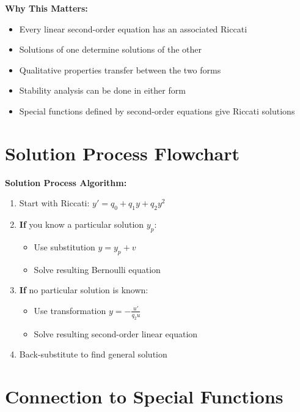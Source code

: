 \documentclass[12pt]{article}
\begin{document}
\begin{insight}
\textbf{Why This Matters:}
\begin{itemize}
    \item Every linear second-order equation has an associated Riccati
    \item Solutions of one determine solutions of the other
    \item Qualitative properties transfer between the two forms
    \item Stability analysis can be done in either form
    \item Special functions defined by second-order equations give Riccati solutions
\end{itemize}
\end{insight}

\section{Solution Process Flowchart}

\begin{keypoint}
\textbf{Solution Process Algorithm:}
\begin{enumerate}
    \item Start with Riccati: $y' = q_0 + q_1y + q_2y^2$
    \item \textbf{If} you know a particular solution $y_p$:
    \begin{itemize}
        \item Use substitution $y = y_p + v$
        \item Solve resulting Bernoulli equation
    \end{itemize}
    \item \textbf{If} no particular solution is known:
    \begin{itemize}
        \item Use transformation $y = -\frac{u'}{q_2 u}$
        \item Solve resulting second-order linear equation
    \end{itemize}
    \item Back-substitute to find general solution
\end{enumerate}
\end{keypoint}

\section{Connection to Special Functions}
\end{document}
